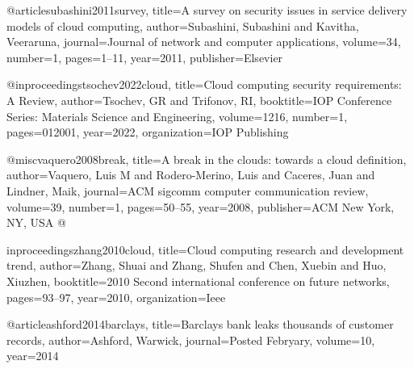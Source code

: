 @article{subashini2011survey,
title={A survey on security issues in service delivery models of cloud computing},
author={Subashini, Subashini and Kavitha, Veeraruna},
journal={Journal of network and computer applications},
volume={34},
number={1},
pages={1--11},
year={2011},
publisher={Elsevier}
}

@inproceedings{tsochev2022cloud,
title={Cloud computing security requirements: A Review},
author={Tsochev, GR and Trifonov, RI},
booktitle={IOP Conference Series: Materials Science and Engineering},
volume={1216},
number={1},
pages={012001},
year={2022},
organization={IOP Publishing}
}

@misc{vaquero2008break,
title={A break in the clouds: towards a cloud definition},
author={Vaquero, Luis M and Rodero-Merino, Luis and Caceres, Juan and Lindner, Maik},
journal={ACM sigcomm computer communication review},
volume={39},
number={1},
pages={50--55},
year={2008},
publisher={ACM New York, NY, USA}
}
@

inproceedings{zhang2010cloud,
title={Cloud computing research and development trend},
author={Zhang, Shuai and Zhang, Shufen and Chen, Xuebin and Huo, Xiuzhen},
booktitle={2010 Second international conference on future networks},
pages={93--97},
year={2010},
organization={Ieee}
}

@article{ashford2014barclays,
title={Barclays bank leaks thousands of customer records},
author={Ashford, Warwick},
journal={Posted Febryary},
volume={10},
year={2014}
}